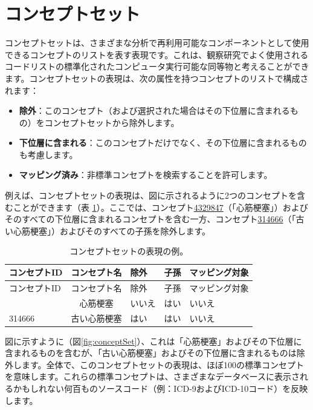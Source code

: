 \documentclass[
  11pt]{book}
\providecommand{\tightlist}{%
  \setlength{\itemsep}{0pt}\setlength{\parskip}{0pt}}
\theoremstyle{definition}
\theoremstyle{definition}
\theoremstyle{definition}
\theoremstyle{definition}
\theoremstyle{remark}
\begin{document}
\section{コンセプトセット}\label{conceptSets}


コンセプトセットは、さまざまな分析で再利用可能なコンポーネントとして使用できるコンセプトのリストを表す表現です。これは、観察研究でよく使用されるコードリストの標準化されたコンピュータ実行可能な同等物と考えることができます。コンセプトセットの表現は、次の属性を持つコンセプトのリストで構成されます：

\begin{itemize}
\tightlist
\item
  \textbf{除外}：このコンセプト（および選択された場合はその下位層に含まれるもの）をコンセプトセットから除外します。
\item
  \textbf{下位層に含まれる}：このコンセプトだけでなく、その下位層に含まれるものも考慮します。
\item
  \textbf{マッピング済み}：非標準コンセプトを検索することを許可します。
\end{itemize}

例えば、コンセプトセットの表現は、図に示されるように2つのコンセプトを含むことができます（表 \ref{tab:conceptSetExpression}）。ここでは、コンセプト\href{http://athena.ohdsi.org/search-terms/terms/4329847}{4329847}（「心筋梗塞」）およびそのすべての下位層に含まれるコンセプトを含む一方、コンセプト\href{http://athena.ohdsi.org/search-terms/terms/314666}{314666}（「古い心筋梗塞」）およびそのすべての子孫を除外します。

\begin{longtable}[]{@{}lclll@{}}
\caption{\label{tab:conceptSetExpression} コンセプトセットの表現の例。}\tabularnewline
\toprule\noalign{}
コンセプトID & コンセプト名 & 除外 & 子孫 & マッピング対象 \\
\midrule\noalign{}
\endfirsthead
\toprule\noalign{}
コンセプトID & コンセプト名 & 除外 & 子孫 & マッピング対象 \\
\midrule\noalign{}
\endhead
\bottomrule\noalign{}
\endlastfoot
4329847 & 心筋梗塞 & いいえ & はい & いいえ \\
314666 & 古い心筋梗塞 & はい & はい & いいえ \\
\end{longtable}

図に示すように（図\ref{fig:conceptSet}）、これは「心筋梗塞」およびその下位層に含まれるものを含むが、「古い心筋梗塞」およびその下位層に含まれるものは除外します。全体で、このコンセプトセットの表現は、ほぼ100の標準コンセプトを意味します。これらの標準コンセプトは、さまざまなデータベースに表示されるかもしれない何百ものソースコード（例：ICD-9およびICD-10コード）を反映します。
\end{document}
